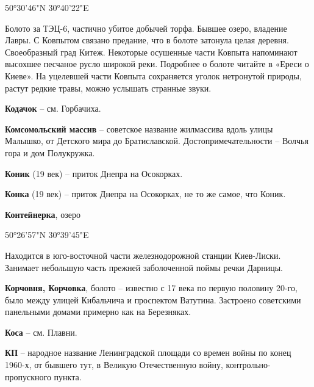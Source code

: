 50°30'46"N 30°40'22"E

Болото за ТЭЦ-6, частично убитое добычей торфа. Бывшее озеро, владение Лавры. С Ковпытом связано предание, что в болоте затонула целая деревня. Своеобразный град Китеж. Некоторые осушенные части Ковпыта напоминают высохшее песчаное русло широкой реки. Подробнее о болоте читайте в «Ереси о Киеве». На уцелевшей части Ковпыта сохраняется уголок нетронутой природы, растут редкие травы, можно услышать странные звуки.\\

\medskip

\textbf{Кодачок} – см. Горбачиха.\\

\medskip

\textbf{Комсомольский массив} – советское название жилмассива вдоль улицы Малышко, от Детского мира до Братиславской. Достопримечательности – Волчья гора и дом Полукружка.\\

\medskip

\textbf{Коник} (19 век) – приток Днепра на Осокорках.\\

\medskip


\textbf{Конка} (19 век) – приток Днепра на 
Осокорках, не то же самое, что Коник.\\

\medskip

\textbf{Контейнерка}, озеро

50°26'57"N 30°39'45"E

Находится в юго-восточной части железнодорожной станции Киев-Лиски. Занимает небо\-льшую часть прежней заболоченной поймы речки Дарницы.\\

\medskip


\textbf{Корчовня, Корчовка}, болото – известно с 17 века по первую половину 20-го, было между улицей Кибальчича и проспектом Ватутина. Застроено советскими панельными домами примерно как на Березняках.\\

\medskip

\textbf{Коса} – см. Плавни.\\

\medskip

\textbf{КП} – народное название Ленинградской площади со времен войны по конец 1960-х, от бывшего тут, в Великую Отечественную войну, кон\-трольно-пропускного пункта.\\ 

